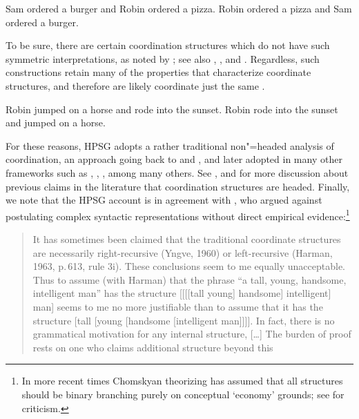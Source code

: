 \documentclass[output=paper]{langsci/langscibook}
\begin{document}
\begin{exe}
\ex
\begin{xlista}
\ex Sam ordered a burger and Robin ordered a pizza.
\ex Robin ordered a pizza and Sam ordered a burger.
\end{xlista}\label{c1}
\end{exe}

\noindent
To be sure, there are certain coordination structures which do not have such symmetric 
interpretations, as noted by \citet{Ross67a}; see also
\citet{goldsmith}, \citet{lakoff86}, and \citet{levinprince86}.
Regardless, such constructions retain many of the properties that characterize coordinate structures, and therefore are likely 
coordinate just the same \citep[Ch.5]{kehler}.

\begin{exe}
\ex
\begin{xlista}
\ex Robin jumped on a horse and rode into the sunset.
\ex Robin rode into the sunset and jumped on a horse.
\end{xlista}
\end{exe}

For these reasons, HPSG adopts a rather traditional non"=headed analysis of coordination, an approach  going back
to \citet[195]{Bloomfield33a-u} and  \citet{Ross67a}, and later adopted in many other frameworks such as \citet{pesetsky}, \citet{gazdarc},  \citet[1275]{rodney}, among many others. 
See \citet{borsley94}, \citet{Borsley:05} and 
\citet[Ch.2]{chavesthesis} for more discussion about previous claims in the literature that coordination structures are headed.
Finally, we note that the HPSG account is in agreement with \citet[196]{Chomsky65a}, who argued against postulating complex syntactic representations without direct empirical evidence:\footnote{In more recent times Chomskyan theorizing has assumed that all structures should be binary branching purely on conceptual `economy' grounds; see \citet{JL99a-u} for criticism.}

\begin{quote}
It has sometimes been claimed that the traditional coordinate structures are necessarily right-recursive (Yngve, 1960) or left-recursive (Harman, 1963, p.\,613, rule 3i). These conclusions seem to me equally unacceptable. Thus to assume (with Harman) that the phrase “a tall, young, handsome, intelligent man” has the structure [[[[tall young] handsome] intelligent] man] seems to me no more justifiable than to assume that it has
the structure [tall [young [handsome [intelligent man]]]]. In fact, there is no grammatical
motivation for any internal structure, [\ldots] The burden of proof rests on one who claims additional
structure beyond this \citep[196,197]{Chomsky65a}
\end{quote}
\end{document}
